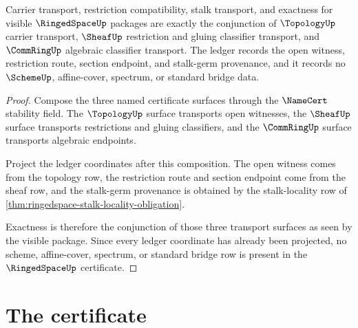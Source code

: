 \begin{theorem}\label{thm:ringedspace-stability-ledger-obligation}
Carrier transport, restriction compatibility, stalk transport, and exactness for visible $\RingedSpaceUp$ packages are exactly the conjunction of $\TopologyUp$ carrier transport, $\SheafUp$ restriction and gluing classifier transport, and $\CommRingUp$ algebraic classifier transport. The ledger records the open witness, restriction route, section endpoint, and stalk-germ provenance, and it records no $\SchemeUp$, affine-cover, spectrum, or standard bridge data.
\end{theorem}
\begin{proof}
Compose the three named certificate surfaces through the $\NameCert$ stability field. The $\TopologyUp$ surface transports open witnesses, the $\SheafUp$ surface transports restrictions and gluing classifiers, and the $\CommRingUp$ surface transports algebraic endpoints.

Project the ledger coordinates after this composition. The open witness comes from the topology row, the restriction route and section endpoint come from the sheaf row, and the stalk-germ provenance is obtained by the stalk-locality row of \autoref{thm:ringedspace-stalk-locality-obligation}.

Exactness is therefore the conjunction of those three transport surfaces as seen by the visible package. Since every ledger coordinate has already been projected, no scheme, affine-cover, spectrum, or standard bridge row is present in the $\RingedSpaceUp$ certificate.
\end{proof}

\section{The certificate}
\label{sec:ringedspace-certificate}

